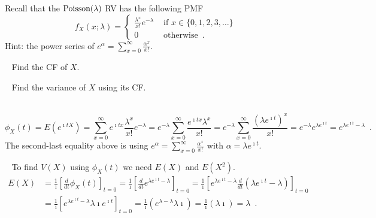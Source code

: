 \begin{ExerciseList}
\Exercise


Recall that the $\mbox{{\rm Poisson}}(\lambda)$ RV has the following PMF
\[
f_X(x;\lambda) = 
\begin{cases}
\frac{\lambda^x}{x!}e^{-\lambda} & \text{ if } x \in \{0,1,2,3,\ldots \}\\
0 & \text{ otherwise} \enspace .
\end{cases}
\]
{Hint: the power series of $e^{\alpha} = \sum_{x=0}^{\infty} \frac{\alpha^x}{x!}$.}
\be
\item~
Find the CF of $X$.
\item~
Find the variance of $X$ using its CF.
\ee
\Answer
~\\
\be
\item~
\[
\phi_X(t) = E\left(e^{\imath t X}\right)
= \sum_{x=0}^{\infty} e^{\imath t x} \frac{\lambda^x}{x!}e^{-\lambda}
= e^{-\lambda} \sum_{x=0}^{\infty} \frac{e^{\imath t x} \lambda^x}{x!}
= e^{-\lambda} \sum_{x=0}^{\infty} \frac{\left(\lambda e^{\imath t}\right)^x}{x!}
= e^{-\lambda} e^{\lambda e^{\imath t}} = e^{\lambda e^{\imath t} - \lambda} \enspace .
\]
The second-last equality above is using $e^{\alpha} = \sum_{x=0}^{\infty} \frac{\alpha^x}{x!}$ with $\alpha=\lambda e^{\imath t}$.
\item~
To find $V(X)$ using $\phi_X(t)$ we need $E(X)$ and $E(X^2)$.
\begin{align*}
E(X) 
&= \frac{1}{\imath} \left[ \frac{d}{dt} \phi_X(t) \right]_{t=0}
= \frac{1}{\imath} \left[ \frac{d}{dt} e^{\lambda e^{\imath t} - \lambda} \right]_{t=0}
= \frac{1}{\imath} \left[ e^{\lambda e^{\imath t} - \lambda} \frac{d}{dt} \left(\lambda e^{\imath t} - \lambda \right) \right]_{t=0}\\
&= \frac{1}{\imath} \left[ e^{\lambda e^{\imath t} - \lambda} \lambda \imath e^{\imath t} \right]_{t=0}
= \frac{1}{\imath} \left( e^{\lambda - \lambda} \lambda \imath \right)
= \frac{1}{\imath} \left( \lambda \imath \right) = \lambda \enspace .
\end{align*}

\end{ExerciseList}
